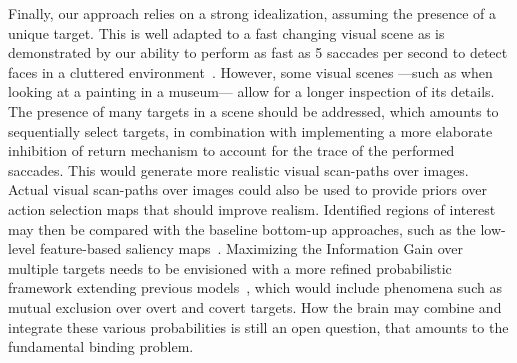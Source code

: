 Finally, our approach relies on a strong idealization, assuming the presence of a unique target. This is well adapted to a fast changing visual scene as is demonstrated by our ability to perform as fast as 5 saccades per second to detect faces in a cluttered environment~\cite{Martin18}. However, some visual scenes ---such as when looking at a painting in a museum--- allow for a longer inspection of its details. The presence of many targets in a scene should be addressed, which amounts to sequentially select targets, in combination with implementing a more elaborate inhibition of return mechanism to account for the trace of the performed saccades. This would generate more realistic visual scan-paths over images. Actual visual scan-paths over images could also be used to provide priors over action selection maps that should improve realism. Identified regions of interest may then be compared with the baseline bottom-up approaches, such as the low-level feature-based saliency maps~\cite{Itti01}. Maximizing the Information Gain over multiple targets needs to be envisioned with a more refined probabilistic framework extending previous models~\cite{Friston12}, which would include phenomena such as mutual exclusion over overt and covert targets. How the brain may combine and integrate these various probabilities is still an open question, that amounts to the fundamental binding problem. %
